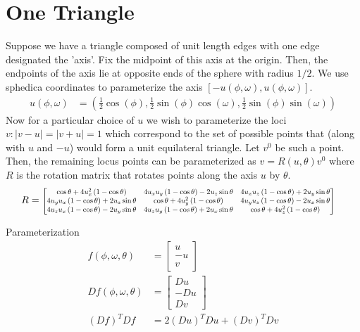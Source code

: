 \documentclass[12pt]{article}
\newcommand*{\Scale}[2][4]{\scalebox{#1}{$#2$}}%
\begin{document}
\maketitle
\section{One Triangle}

Suppose we have a triangle composed of unit length edges with one edge designated the 'axis'. Fix the midpoint of this axis at the origin. Then, the endpoints of the axis lie at opposite ends of the sphere with radius $1/2$. We use sphedica coordinates to parameterize the axis $[-u(\phi,\omega),u(\phi,\omega)]$.
\begin{align}
u(\phi,\omega) &= \left(\frac{1}{2}\cos(\phi),\frac{1}{2}\sin(\phi)\cos(\omega), \frac{1}{2}\sin(\phi)\sin(\omega) \right)
\end{align}
Now for a particular choice of $u$ we wish to parameterize the loci $v : |v - u| = |v + u| = 1$ which correspond to the set of possible points that (along with $u$ and $-u$) would form a unit equilateral triangle. Let $v^0$ be such a point. Then, the remaining locus points can be parameterized as $v = R(u, \theta)v^0$ where $R$ is the rotation matrix that rotates points along the axis $u$ by $\theta$.
\begin{align}
R &= \Scale[0.75]{\begin{bmatrix} \cos \theta + 4u_x^2 \left(1-\cos \theta\right) & 4u_x u_y \left(1-\cos \theta\right) - 2u_z \sin \theta & 4u_x u_z \left(1-\cos \theta\right) + 2u_y \sin \theta \\ 4u_y u_x \left(1-\cos \theta\right) + 2u_z \sin \theta & \cos \theta + 4u_y^2\left(1-\cos \theta\right) & 4u_y u_z \left(1-\cos \theta\right) - 2u_x \sin \theta \\ 4u_z u_x \left(1-\cos \theta\right) - 2u_y \sin \theta   & 4u_z u_y \left(1-\cos \theta\right) + 2u_x \sin \theta & \cos \theta + 4u_z^2\left(1-\cos \theta\right) 
\end{bmatrix}}
\end{align}

Parameterization
\begin{align}
  f(\phi, \omega, \theta) &= \begin{bmatrix} u \\ -u \\ v \end{bmatrix} \\
  Df(\phi, \omega, \theta) &= \begin{bmatrix} Du \\ -Du \\ Dv \end{bmatrix} \\
  \left(Df\right)^TDf &=   2\left(Du\right)^TDu  + \left(Dv\right)^TDv
\end{align}
\end{document}
